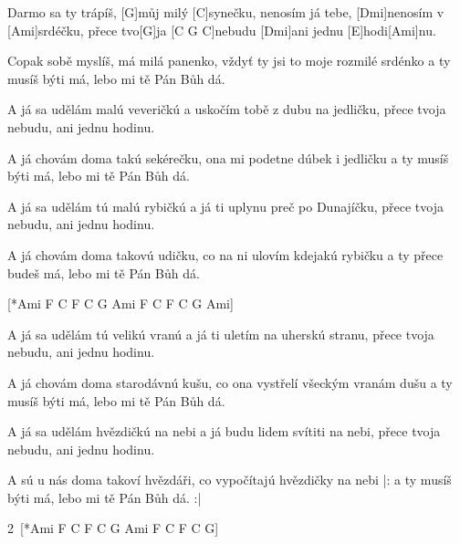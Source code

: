 
\sloka
[Ami]Darmo sa ty trápíš, [G]můj milý [C]synečku,
nenosím já tebe, [Dmi]nenosím v [Ami]srdéčku,
přece tvo[G]ja [C G C]nebudu [Dmi]ani jednu [E]hodi[Ami]nu.

\sloka
Copak sobě myslíš, má milá panenko,
vždyť ty jsi to moje rozmilé srdénko
a ty musíš býti má, lebo mi tě Pán Bůh dá.

\sloka
A já sa udělám malú veveričkú
a uskočím tobě z dubu na jedličku,
přece tvoja nebudu, ani jednu hodinu.

\sloka
A já chovám doma takú sekérečku,
ona mi podetne dúbek i jedličku
a ty musíš býti má, lebo mi tě Pán Bůh dá.

\sloka
A já sa udělám tú malú rybičkú
a já ti uplynu preč po Dunajíčku,
přece tvoja nebudu, ani jednu hodinu.

\sloka
A já chovám doma takovú udičku,
co na ni ulovím kdejakú rybičku
a ty přece budeš má, lebo mi tě Pán Bůh dá.

[*Ami F C F C G Ami F C F C G Ami]

\sloka
A já sa udělám tú velikú vranú
a já ti uletím na uherskú stranu,
přece tvoja nebudu, ani jednu hodinu.

\sloka
A já chovám doma starodávnú kušu,
co ona vystřelí všeckým vranám dušu
a ty musíš býti má, lebo mi tě Pán Bůh dá.

\sloka
A já sa udělám hvězdičkú na nebi
a já budu lidem svítiti na nebi,
přece tvoja nebudu, ani jednu hodinu.

\sloka
A sú u nás doma takoví hvězdáři,
co vypočítajú hvězdičky na nebi
|: a ty musíš býti má, lebo mi tě Pán Bůh dá. :|

2\x\ [*Ami F C F C G Ami F C F C G]
